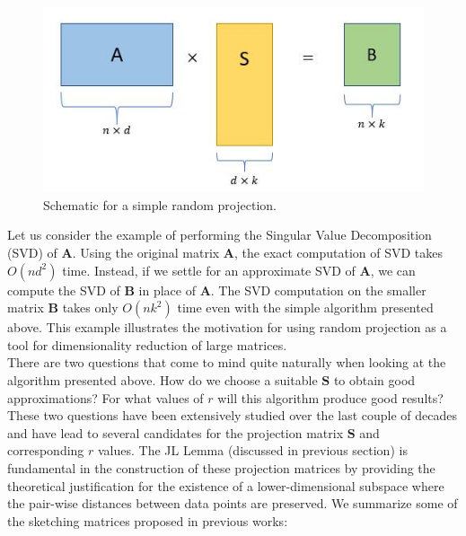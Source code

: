 \begin{center}
\begin{figure}[!t]
\centering
\includegraphics[scale=0.8]{figures/rp_1.JPG}
\caption{Schematic for a simple random projection.}
\label{fig:rp_scheme}
\end{figure}
\end{center}

Let us consider the example of performing the Singular Value Decomposition (SVD) of $\textbf{A}$. Using the original matrix $\textbf{A}$, the exact computation of SVD takes $O(nd^2)$ time. Instead, if we settle for an approximate SVD of $\textbf{A}$, we can compute the SVD of $\textbf{B}$ in place of $\textbf{A}$. The SVD computation on the smaller matrix $\textbf{B}$ takes only $O(nk^2)$ time even with the simple algorithm presented above. This example illustrates the motivation for using random projection as a tool for dimensionality reduction of large matrices. \\

There are two questions that come to mind quite naturally when looking at the algorithm presented above. How do we choose a suitable $\textbf{S}$ to obtain good approximations? For what values of $r$ will this algorithm produce good results? These two questions have been extensively studied over the last couple of decades and have lead to several candidates for the projection matrix $\textbf{S}$ and corresponding $r$ values. The JL Lemma (discussed in previous section) is fundamental in the construction of these projection matrices by providing the theoretical justification for the existence of a lower-dimensional subspace where the pair-wise distances between data points are preserved. We summarize some of the sketching matrices proposed in previous works:

